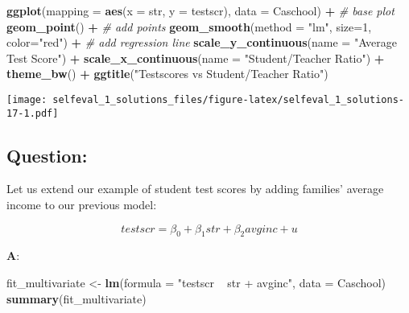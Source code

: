 \documentclass[12pt,]{article}
\newenvironment{Shaded}{\begin{snugshade}}{\end{snugshade}}
\newcommand{\CommentTok}[1]{\textcolor[rgb]{0.56,0.35,0.01}{\textit{#1}}}
\newcommand{\DataTypeTok}[1]{\textcolor[rgb]{0.13,0.29,0.53}{#1}}
\newcommand{\DecValTok}[1]{\textcolor[rgb]{0.00,0.00,0.81}{#1}}
\newcommand{\KeywordTok}[1]{\textcolor[rgb]{0.13,0.29,0.53}{\textbf{#1}}}
\newcommand{\NormalTok}[1]{#1}
\newcommand{\OperatorTok}[1]{\textcolor[rgb]{0.81,0.36,0.00}{\textbf{#1}}}
\newcommand{\StringTok}[1]{\textcolor[rgb]{0.31,0.60,0.02}{#1}}
\begin{document}
\begin{Shaded}
\begin{Highlighting}[]
\KeywordTok{ggplot}\NormalTok{(}\DataTypeTok{mapping =} \KeywordTok{aes}\NormalTok{(}\DataTypeTok{x =}\NormalTok{ str, }\DataTypeTok{y =}\NormalTok{ testscr), }\DataTypeTok{data =}\NormalTok{ Caschool) }\OperatorTok{+}\StringTok{ }\CommentTok{# base plot}
\StringTok{  }\KeywordTok{geom_point}\NormalTok{() }\OperatorTok{+}\StringTok{ }\CommentTok{# add points}
\StringTok{  }\KeywordTok{geom_smooth}\NormalTok{(}\DataTypeTok{method =} \StringTok{"lm"}\NormalTok{, }\DataTypeTok{size=}\DecValTok{1}\NormalTok{, }\DataTypeTok{color=}\StringTok{"red"}\NormalTok{) }\OperatorTok{+}\StringTok{ }\CommentTok{# add regression line}
\StringTok{  }\KeywordTok{scale_y_continuous}\NormalTok{(}\DataTypeTok{name =} \StringTok{"Average Test Score"}\NormalTok{) }\OperatorTok{+}\StringTok{ }
\StringTok{  }\KeywordTok{scale_x_continuous}\NormalTok{(}\DataTypeTok{name =} \StringTok{"Student/Teacher Ratio"}\NormalTok{) }\OperatorTok{+}\StringTok{ }
\StringTok{  }\KeywordTok{theme_bw}\NormalTok{() }\OperatorTok{+}\StringTok{ }\KeywordTok{ggtitle}\NormalTok{(}\StringTok{"Testscores vs Student/Teacher Ratio"}\NormalTok{)}
\end{Highlighting}
\end{Shaded}

\texttt{[image: selfeval\_1\_solutions\_files/figure-latex/selfeval\_1\_solutions-17-1.pdf]}

\hypertarget{question-11}{%
\subsection{Question:}\label{question-11}}

Let us extend our example of student test scores by adding families'
average income to our previous model:

\begin{equation}
testscr = \beta_0 +  \beta_1  str +   \beta_2  avginc + u
\end{equation}

\textbf{A}:

\begin{Shaded}
\begin{Highlighting}[]
\NormalTok{fit_multivariate <-}\StringTok{ }\KeywordTok{lm}\NormalTok{(}\DataTypeTok{formula =} \StringTok{"testscr ~ str + avginc"}\NormalTok{, }\DataTypeTok{data =}\NormalTok{ Caschool)}
\KeywordTok{summary}\NormalTok{(fit_multivariate)}
\end{Highlighting}
\end{Shaded}
\end{document}
